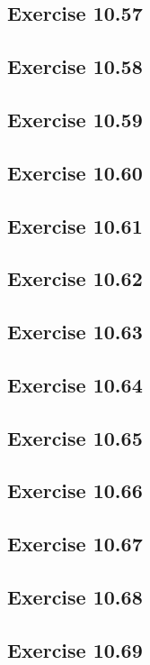 \documentclass[a4paper,12pt]{article}
\begin{document}
\subsection*{Exercise 10.57}
\subsection*{Exercise 10.58}
\subsection*{Exercise 10.59}
\subsection*{Exercise 10.60}
\subsection*{Exercise 10.61}
\subsection*{Exercise 10.62}
\subsection*{Exercise 10.63}
\subsection*{Exercise 10.64}
\subsection*{Exercise 10.65}
\subsection*{Exercise 10.66}
\subsection*{Exercise 10.67}
\subsection*{Exercise 10.68}
\subsection*{Exercise 10.69}
\end{document}

